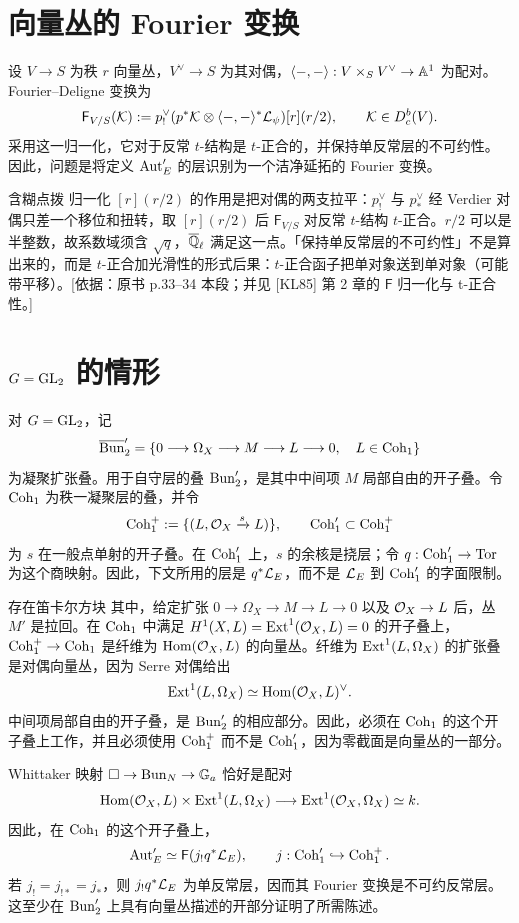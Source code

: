 \section{向量丛的 Fourier 变换}\label{sec:5.2}
设 $V\to S$ 为秩 $r$ 向量丛，$V^\vee\to S$ 为其对偶，$\langle-,-\rangle:V\times_S V^\vee\to\mathbb{A}^1$ 为配对。Fourier–Deligne 变换\cite{KL85}为
\[\mathsf F_{V/S}(\mathcal{K}):=p_!^\vee(p^*\mathcal{K}\otimes\langle-,-\rangle^*\mathcal{L}_\psi)[r](r/2),\qquad\mathcal{K}\in D_c^b(V).\]
采用这一归一化，它对于反常 $t$-结构是 $t$-正合的，并保持单反常层的不可约性。因此，问题是将定义 $\operatorname{Aut}'_E$ 的层识别为一个洁净延拓的 Fourier 变换。
\begin{transnote}{含糊点拨}
归一化 $[r](r/2)$ 的作用是把对偶的两支拉平：$p^\vee_!$ 与 $p^\vee_*$ 经 Verdier 对偶只差一个移位和扭转，取 $[r](r/2)$ 后 $\mathsf F_{V/S}$ 对反常 $t$-结构 $t$-正合。$r/2$ 可以是半整数，故系数域须含 $\sqrt q$，$\overline{\mathbb{Q}}_{\ell}$ 满足这一点。「保持单反常层的不可约性」不是算出来的，而是 $t$-正合加光滑性的形式后果：$t$-正合函子把单对象送到单对象（可能带平移）。[依据：原书 p.33–34 本段；并见 [KL85] 第 2 章的 $\mathsf F$ 归一化与 t-正合性。]
\end{transnote}
\section{\texorpdfstring{$G=\operatorname{GL}_2$}{G=GL₂} 的情形}\label{sec:5.3}
对 $G=\operatorname{GL}_2$，记
\[\overline{\operatorname{Bun}}'_2=\{0\longrightarrow\Omega_X\longrightarrow M\longrightarrow L\longrightarrow0,\quad L\in\operatorname{Coh}_1\}\]
为凝聚扩张叠。用于自守层的叠 $\operatorname{Bun}'_2$，是其中中间项 $M$ 局部自由的开子叠。令 $\operatorname{Coh}_1$ 为秩一凝聚层的叠，并令
\[\operatorname{Coh}_1^+:=\{(L,\mathcal{O}_X\xrightarrow{s}L)\},\qquad\operatorname{Coh}'_1\subset\operatorname{Coh}_1^+\]
为 $s$ 在一般点单射的开子叠。在 $\operatorname{Coh}'_1$ 上，$s$ 的余核是挠层；令 $q:\operatorname{Coh}'_1\to\operatorname{Tor}$ 为这个商映射。因此，下文所用的层是 $q^*\mathcal{L}_E$，而不是 $\mathcal{L}_E$ 到 $\operatorname{Coh}'_1$ 的字面限制。

存在笛卡尔方块
其中，给定扩张 $0\to\Omega_X\to M\to L\to0$ 以及 $\mathcal{O}_X\to L$ 后，丛 $M'$ 是拉回。在 $\operatorname{Coh}_1$ 中满足 $H^1(X,L)=\operatorname{Ext}^1(\mathcal{O}_X,L)=0$ 的开子叠上，$\operatorname{Coh}_1^+\to\operatorname{Coh}_1$ 是纤维为 $\operatorname{Hom}(\mathcal{O}_X,L)$ 的向量丛。纤维为 $\operatorname{Ext}^1(L,\Omega_X)$ 的扩张叠是对偶向量丛，因为 Serre 对偶给出
\[\operatorname{Ext}^1(L,\Omega_X)\simeq\operatorname{Hom}(\mathcal{O}_X,L)^\vee.\]
中间项局部自由的开子叠，是 $\operatorname{Bun}'_2$ 的相应部分。因此，必须在 $\operatorname{Coh}_1$ 的这个开子叠上工作，并且必须使用 $\operatorname{Coh}_1^+$ 而不是 $\operatorname{Coh}'_1$，因为零截面是向量丛的一部分。

Whittaker 映射 $\square\to\operatorname{Bun}_N\to\mathbb{G}_{a}$ 恰好是配对
\[\operatorname{Hom}(\mathcal{O}_X,L)\times\operatorname{Ext}^1(L,\Omega_X)\longrightarrow\operatorname{Ext}^1(\mathcal{O}_X,\Omega_X)\simeq k.\]
因此，在 $\operatorname{Coh}_1$ 的这个开子叠上，
\[\operatorname{Aut}'_E\simeq\mathsf F(j_!q^*\mathcal{L}_E),\qquad j:\operatorname{Coh}'_1\hookrightarrow\operatorname{Coh}_1^+.\]
若 $j_!=j_{!*}=j_*$，则 $j_!q^*\mathcal{L}_E$ 为单反常层，因而其 Fourier 变换是不可约反常层。这至少在 $\operatorname{Bun}'_2$ 上具有向量丛描述的开部分证明了所需陈述。
